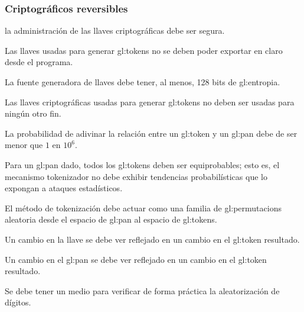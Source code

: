 %
%

\subsubsection{Criptográficos reversibles}

{
  la administración de las llaves criptográficas debe ser segura.

  {
    Las llaves usadas para generar \glspl{gl:token} no se deben poder
    exportar en claro desde el programa.
  }

  {
    La fuente generadora de llaves debe tener, al menos, 128 bits de
    \gls{gl:entropia}.
  }

  {
    Las llaves criptográficas usadas para generar \glspl{gl:token} no
    deben ser usadas para ningún otro fin.
  }
}

{
  La probabilidad de adivinar la relación entre un \gls{gl:token} y un
  \gls{gl:pan} debe de ser menor que $ 1 $ en $ 10^6 $.

  {
    Para un \gls{gl:pan} dado, todos los \glspl{gl:token} deben ser
    equiprobables; esto es, el mecanismo tokenizador no debe exhibir
    tendencias probabilísticas que lo expongan a ataques estadísticos.
  }

  {
    El método de tokenización debe actuar como una familia de
    \glspl{gl:permutacion} aleatoria desde el espacio de \gls{gl:pan} al
    espacio de \glspl{gl:token}.
  }

  {
    Un cambio en la llave se debe ver reflejado en un cambio en el
    \gls{gl:token} resultado.
  }

  {
    Un cambio en el \gls{gl:pan} se debe ver reflejado en un cambio en el
    \gls{gl:token} resultado.
  }

  {
    Se debe tener un medio para verificar de forma práctica la aleatorización 
    de dígitos.
  }

}

